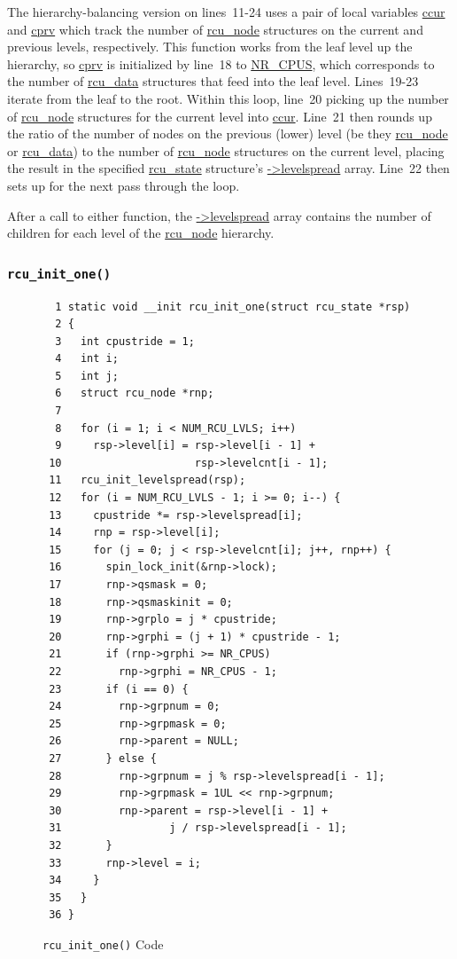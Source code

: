 The hierarchy-balancing version on lines~11-24
uses a pair of local variables \url{ccur} and \url{cprv} which track
the number of \url{rcu_node} structures on the current and previous
levels, respectively.
This function works from the leaf level up the hierarchy, so \url{cprv}
is initialized by line~18 to \url{NR_CPUS}, which corresponds
to the number of \url{rcu_data} structures that feed into the leaf level.
Lines~19-23 iterate from the leaf to the root.
Within this loop, line~20 picking up
the number of \url{rcu_node} structures for the current level into
\url{ccur}.
Line~21 then rounds up the ratio of the number of nodes on the previous
(lower) level (be they \url{rcu_node} or \url{rcu_data})
to the number of \url{rcu_node} structures on the current
level, placing the result in the specified \url{rcu_state} structure's
\url{->levelspread} array.
Line~22 then sets up for the next pass through the loop.

After a call to either function, the \url{->levelspread} array contains
the number of children for each level of the \url{rcu_node} hierarchy.

\subsubsection{\tt rcu\_init\_one()}
\label{app:rcuimpl:rcutreewt:rcu-init-one}

\begin{figure}[tbp]
{ \scriptsize
\begin{verbatim}
  1 static void __init rcu_init_one(struct rcu_state *rsp)
  2 {
  3   int cpustride = 1;
  4   int i;
  5   int j;
  6   struct rcu_node *rnp;
  7 
  8   for (i = 1; i < NUM_RCU_LVLS; i++)
  9     rsp->level[i] = rsp->level[i - 1] +
 10                     rsp->levelcnt[i - 1];
 11   rcu_init_levelspread(rsp);
 12   for (i = NUM_RCU_LVLS - 1; i >= 0; i--) {
 13     cpustride *= rsp->levelspread[i];
 14     rnp = rsp->level[i];
 15     for (j = 0; j < rsp->levelcnt[i]; j++, rnp++) {
 16       spin_lock_init(&rnp->lock);
 17       rnp->qsmask = 0;
 18       rnp->qsmaskinit = 0;
 19       rnp->grplo = j * cpustride;
 20       rnp->grphi = (j + 1) * cpustride - 1;
 21       if (rnp->grphi >= NR_CPUS)
 22         rnp->grphi = NR_CPUS - 1;
 23       if (i == 0) {
 24         rnp->grpnum = 0;
 25         rnp->grpmask = 0;
 26         rnp->parent = NULL;
 27       } else {
 28         rnp->grpnum = j % rsp->levelspread[i - 1];
 29         rnp->grpmask = 1UL << rnp->grpnum;
 30         rnp->parent = rsp->level[i - 1] +
 31                 j / rsp->levelspread[i - 1];
 32       }
 33       rnp->level = i;
 34     }
 35   }
 36 }
\end{verbatim}
}
\caption{{\tt rcu\_init\_one()} Code}
\label{fig:app:rcuimpl:rcutreewt:Code for rcu-init-one}
\end{figure}

